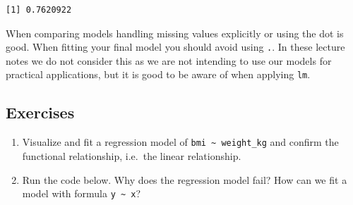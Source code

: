 \documentclass[
  letterpaper,
  DIV=11,
  numbers=noendperiod]{scrreprt}
\newenvironment{Shaded}{\begin{snugshade}}{\end{snugshade}}
\newcommand{\AttributeTok}[1]{\textcolor[rgb]{0.40,0.45,0.13}{#1}}
\newcommand{\CommentTok}[1]{\textcolor[rgb]{0.37,0.37,0.37}{#1}}
\newcommand{\FunctionTok}[1]{\textcolor[rgb]{0.28,0.35,0.67}{#1}}
\newcommand{\NormalTok}[1]{\textcolor[rgb]{0.00,0.23,0.31}{#1}}
\newcommand{\OtherTok}[1]{\textcolor[rgb]{0.00,0.23,0.31}{#1}}
\newcommand{\SpecialCharTok}[1]{\textcolor[rgb]{0.37,0.37,0.37}{#1}}
\providecommand{\tightlist}{%
  \setlength{\itemsep}{0pt}\setlength{\parskip}{0pt}}\usepackage{longtable,booktabs,array}
\begin{document}
\begin{Shaded}
\end{Shaded}

\begin{verbatim}
[1] 0.7620922
\end{verbatim}

When comparing models handling missing values explicitly or using the
dot is good. When fitting your final model you should avoid using
\texttt{.}. In these lecture notes we do not consider this as we are not
intending to use our models for practical applications, but it is good
to be aware of when applying \texttt{lm}.

\subsection{Exercises}\label{exercises-19}

\begin{enumerate}
\def\labelenumi{\arabic{enumi}.}
\tightlist
\item
  Visualize and fit a regression model of
  \texttt{bmi\ \textasciitilde{}\ weight\_kg} and confirm the functional
  relationship, i.e.~the linear relationship.
\item
  Run the code below. Why does the regression model fail? How can we fit
  a model with formula \texttt{y\ \textasciitilde{}\ x}?
\end{enumerate}
\end{document}
